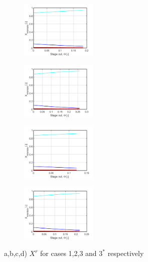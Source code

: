 \begin{figure}[H]
\centering
	\begin{subfigure}[]
		\centering
		\includegraphics[width = 0.4\textwidth]{Images/x_retentate.png}
	\end{subfigure}
	\begin{subfigure}[]
		\centering
		\includegraphics[width = 0.4\textwidth]{Images/x2_retentate.png}
	\end{subfigure}
	\begin{subfigure}[]
		\centering
		\includegraphics[width = 0.4\textwidth]{Images/x3_retentate.png}
	\end{subfigure}
	\begin{subfigure}[]
		\centering
		\includegraphics[width = 0.4\textwidth]{Images/x3star_retentate.png}
	\end{subfigure}	
\caption{a,b,c,d) $X^r$ for cases 1,2,3 and $3^*$ respectively }
\label{fig:fig1}
\end{figure}	

